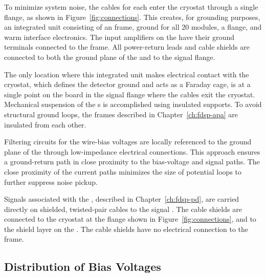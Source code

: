 To minimize system noise, the  cables for each  
enter the cryostat through a single  flange, as shown in 
Figure~\ref{fig:connections}. This creates, for grounding purposes, 
an integrated unit consisting of an  frame, 
ground for all \num{20}  modules, a  flange, and 
warm interface electronics. The input amplifiers on the 
  have their ground terminals connected to 
the  frame. All power-return leads and cable shields are 
connected to both the ground plane of the  and to the 
 signal flange.

The only location where this integrated unit makes electrical contact 
with the cryostat, which defines the detector ground and acts as a 
Faraday cage, is at a single point on the  \fdth board in 
the  signal flange where the cables exit the cryostat. 
Mechanical suspension of the s is accomplished using 
insulated supports. To avoid structural ground loops, the  
frames described in Chapter~\ref{ch:fdsp-apa} are insulated from 
each other.

Filtering circuits for the  wire-bias voltages are 
locally referenced to the ground plane of the  
through low-impedance electrical connections. This approach 
ensures a ground-return path in close proximity to the 
bias-voltage and signal paths. The close proximity of the 
current paths minimizes the size of potential loops to further 
suppress noise pickup.

Signals associated with the , described in 
Chapter~\ref{ch:fdsp-pd}, are carried directly on shielded, 
twisted-pair cables to the signal \fdth. The cable shields 
are connected to the cryostat at the  flange 
shown in Figure~\ref{fig:connections}, and to the  
shield layer on the . The cable shields have no 
electrical connection to the  frame.

\subsection{Distribution of Bias Voltages}
\label{sec:fdsp-tpcelec-design-bias}


